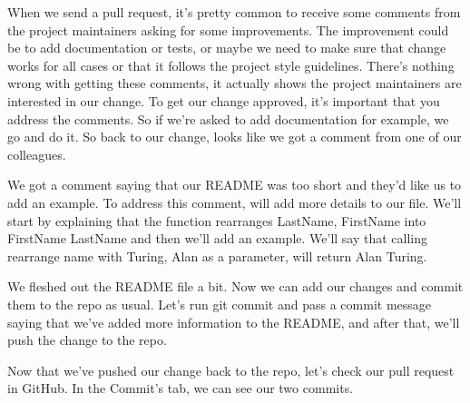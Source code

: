 	
	When we send a pull request, it's pretty common to receive some comments from the project maintainers asking for some improvements. The improvement could be to add documentation or tests, or maybe we need to make sure that change works for all cases or that it follows the project style guidelines. There's nothing wrong with getting these comments, it actually shows the project maintainers are interested in our change. To get our change approved, it's important that you address the comments. So if we're asked to add documentation for example, we go and do it. So back to our change, looks like we got a comment from one of our colleagues.
	
	We got a comment saying that our README was too short and they'd like us to add an example. To address this comment, will add more details to our file. We'll start by explaining that the function rearranges LastName, FirstName into FirstName LastName and then we'll add an example. We'll say that calling rearrange name with Turing, Alan as a parameter, will return Alan Turing.
	
	We fleshed out the README file a bit. Now we can add our changes and commit them to the repo as usual. Let's run git commit and pass a commit message saying that we've added more information to the README, and after that, we'll push the change to the repo.
	
	Now that we've pushed our change back to the repo, let's check our pull request in GitHub. In the Commit's tab, we can see our two commits.
	
